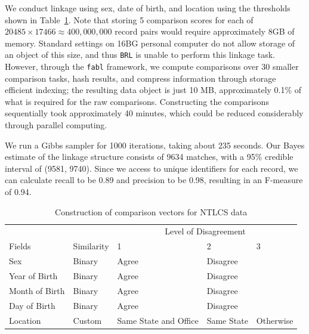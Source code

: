 \documentclass[ba]{imsart}
\begin{document}
We conduct linkage using sex, date of birth, and location using the thresholds shown in Table~\ref{Tab:nltcs-comparisons}. Note that storing 5 comparison scores for each of $20485 \times 17466 \approx 400,000,000$ record pairs would require approximately 8GB of memory. Standard settings on 16BG personal computer do not allow storage of an object of this size, and thus \texttt{BRL} is unable to perform this linkage task. However, through the \texttt{fabl} framework, we compute comparisons over 30 smaller comparison tasks, hash results, and compress information through storage efficient indexing; the resulting data object is just 10 MB, approximately 0.1\% of what is required for the raw comparisons. Constructing the comparisons sequentially took approximately 40 minutes, which could be reduced considerably through parallel computing. 

We run a Gibbs sampler for 1000 iterations, taking about 235 seconds. Our Bayes estimate of the linkage structure consists of 9634 matches, with a 95\% credible interval of (9581, 9740). Since we access to unique identifiers for each record, we can calculate recall to be 0.89 and precision to be 0.98, resulting in an F-measure of 0.94. 

\begin{table}
	\centering
	\begin{tabular}[t]{lllll}
		\hline
		\multicolumn{2}{c}{ } & \multicolumn{3}{c}{Level of Disagreement} \\
		\cline{3-5}
		Fields & Similarity & 1 & 2 & 3\\
		\hline
		Sex & Binary & Agree & Disagree & \\
		Year of Birth & Binary & Agree & Disagree & \\
		Month of Birth & Binary & Agree & Disagree & \\
		Day of Birth & Binary & Agree & Disagree & \\
		Location & Custom & Same State and Office & Same State & Otherwise \\
		\hline
	\end{tabular}
	\caption{Construction of comparison vectors for NTLCS data}\label{Tab:nltcs-comparisons}
\end{table}
\end{document}
